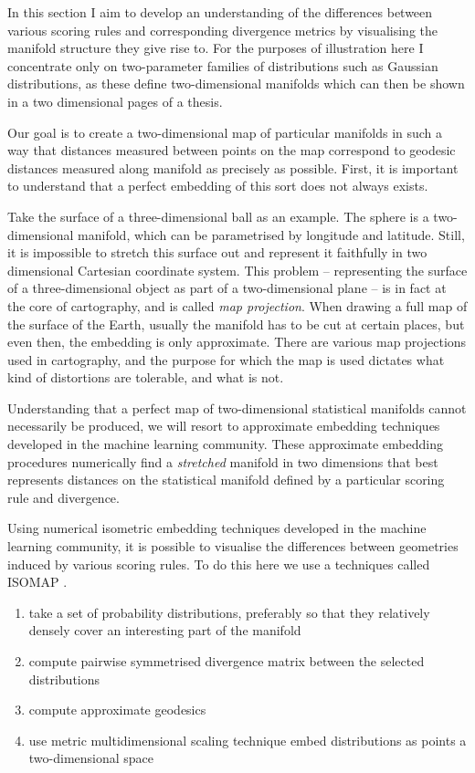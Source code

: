 In this section I aim to develop an understanding of the differences between various scoring rules and corresponding divergence metrics by visualising the manifold structure they give rise to. For the purposes of illustration here I concentrate only on two-parameter families of distributions such as Gaussian distributions, as these define two-dimensional manifolds which can then be shown in a two dimensional pages of a thesis.

Our goal is to create a two-dimensional map of particular manifolds in such a way that distances measured between points on the map correspond to geodesic distances measured along manifold as precisely as possible. First, it is important to understand that a perfect embedding of this sort does not always exists.

Take the surface of a three-dimensional ball as an example. The sphere is a two-dimensional manifold, which can be parametrised by longitude and latitude. Still, it is impossible to stretch this surface out and represent it faithfully in two dimensional Cartesian coordinate system. This problem -- representing the surface of a three-dimensional object as part of a two-dimensional plane -- is in fact at the core of cartography, and is called \emph{map projection}. When drawing a full map of the surface of the Earth, usually the manifold has to be cut at certain places, but even then, the embedding is only approximate. There are various map projections used in cartography, and the purpose for which the map is used dictates what kind of distortions are tolerable, and what is not.

Understanding that a perfect map of two-dimensional statistical manifolds cannot necessarily be produced, we will resort to approximate embedding techniques developed in the machine learning community. These approximate embedding procedures numerically find a \emph{stretched} manifold in two dimensions that best represents distances on the statistical manifold defined by a particular scoring rule and divergence.

Using numerical isometric embedding techniques developed in the machine learning community, it is possible to visualise the differences between geometries induced by various scoring rules. To do this here we use a techniques called ISOMAP \cite{isomap}.

\begin{enumerate}
\item take a set of probability distributions, preferably so that they relatively densely cover an interesting part of the manifold
\item compute pairwise symmetrised divergence matrix between the selected distributions
\item compute approximate geodesics
\item use metric multidimensional scaling technique embed distributions as points a two-dimensional space
\end{enumerate}

